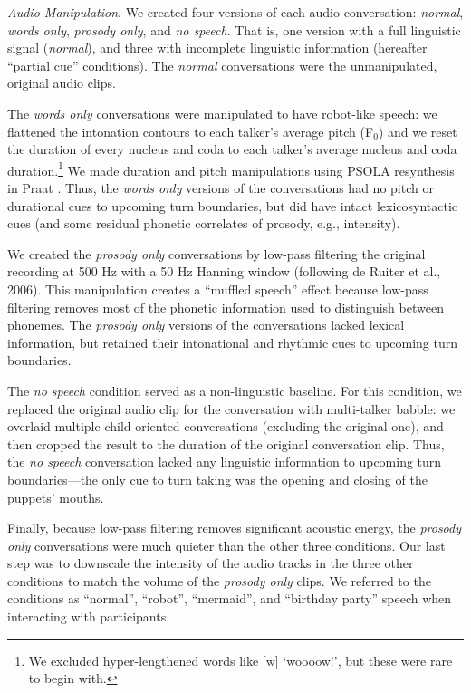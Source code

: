 \documentclass[authoryear, 12pt]{elsarticle}
\begin{document}
\textit{Audio Manipulation}. We created four versions of each audio conversation: \textit{normal}, \textit{words only}, \textit{prosody only}, and \textit{no speech}. That is, one version with a full linguistic signal (\textit{normal}), and three with incomplete linguistic information (hereafter ``partial cue'' conditions). The \textit{normal} conversations were the unmanipulated, original audio clips. 

The \textit{words only} conversations were manipulated to have robot-like speech: we flattened the intonation contours to each talker's average pitch (F$_{0}$) and we reset the duration of every nucleus and coda to each talker's average nucleus and coda duration.\footnote{We excluded hyper-lengthened words like [w] `woooow!', but these were rare to begin with.} We made duration and pitch manipulations using PSOLA resynthesis in Praat \citep{Praat}. Thus, the \textit{words only} versions of the conversations had no pitch or durational cues to upcoming turn boundaries, but did have intact lexicosyntactic cues (and some residual phonetic correlates of prosody, e.g., intensity). 

We created the \textit{prosody only} conversations by low-pass filtering the original recording at 500 Hz with a 50 Hz Hanning window (following de Ruiter et al., 2006). This manipulation creates a ``muffled speech'' effect because low-pass filtering removes most of the phonetic information used to distinguish between phonemes. The \textit{prosody only} versions of the conversations lacked lexical information, but retained their intonational and rhythmic cues to upcoming turn boundaries. 

The \textit{no speech} condition served as a non-linguistic baseline. For this condition, we replaced the original audio clip for the conversation with multi-talker babble: we overlaid multiple child-oriented conversations (excluding the original one), and then cropped the result to the duration of the original conversation clip. Thus, the \textit{no speech} conversation lacked any linguistic information to upcoming turn boundaries---the only cue to turn taking was the opening and closing of the puppets' mouths.

Finally, because low-pass filtering removes significant acoustic energy, the \textit{prosody only} conversations were much quieter than the other three conditions. Our last step was to downscale the intensity of the audio tracks in the three other conditions to match the volume of the \textit{prosody only} clips. We referred to the conditions as ``normal'', ``robot'', ``mermaid'', and ``birthday party'' speech when interacting with participants.
\end{document}
